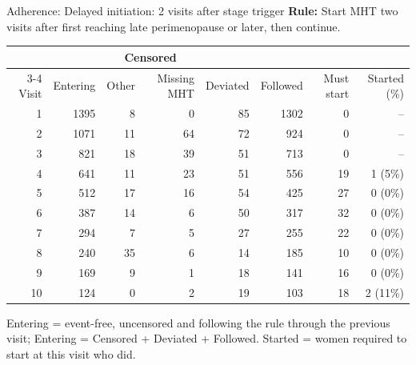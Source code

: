 \begin{frame}{Adherence: Delayed initiation: 2 visits after stage trigger}
\centering
{\small \textbf{Rule:} Start MHT two visits after first reaching late perimenopause or later, then continue.}\par\vspace{6pt}
{\scriptsize
\begin{tabular}{r r r r r r r r}
\toprule
 & & \multicolumn{2}{c}{Censored} & & & & \\
\cmidrule(lr){3-4}
Visit & Entering & Other & Missing MHT & Deviated & Followed & Must start & Started (\%) \\
\midrule
1 & 1395 & 8 & 0 & 85 & 1302 & 0 & -- \\
2 & 1071 & 11 & 64 & 72 & 924 & 0 & -- \\
3 & 821 & 18 & 39 & 51 & 713 & 0 & -- \\
4 & 641 & 11 & 23 & 51 & 556 & 19 & 1 (5\%) \\
5 & 512 & 17 & 16 & 54 & 425 & 27 & 0 (0\%) \\
6 & 387 & 14 & 6 & 50 & 317 & 32 & 0 (0\%) \\
7 & 294 & 7 & 5 & 27 & 255 & 22 & 0 (0\%) \\
8 & 240 & 35 & 6 & 14 & 185 & 10 & 0 (0\%) \\
9 & 169 & 9 & 1 & 18 & 141 & 16 & 0 (0\%) \\
10 & 124 & 0 & 2 & 19 & 103 & 18 & 2 (11\%) \\
\bottomrule
\end{tabular}}
\par\vspace{6pt}
{\tiny Entering = event-free, uncensored and following the rule through the previous visit; Entering = Censored + Deviated + Followed. Started = women required to start at this visit who did.}
\end{frame}

